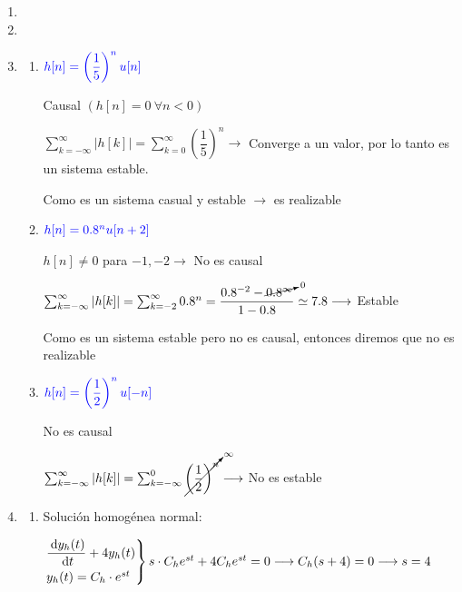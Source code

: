 \begin{enumerate}[label=\color{red}\textbf{\arabic*)}, leftmargin=*]
\begin{enumerate}[label=\color{lightblue}\arabic*)]
		\item {}
		
		\item {} 
	\end{enumerate}
	\item 
	\item 
	\item {}
	\begin{enumerate}[label=\color{red}\alph*)]
		\item $\textcolor{blue}{h[n]=\left(\dfrac{1}{5}\right)^nu[n]}$
		
		Causal $(h[n]=0\:\forall n<0)$
		
		$\sum_{k=-\infty}^{\infty}\left|h[k]\right|=\sum_{k=0}^{\infty}\left(\dfrac{1}{5}\right)^n\longrightarrow$ Converge a un valor, por lo tanto es un sistema estable.
		
		Como es un sistema casual y estable $\longrightarrow$ es realizable
		\item $\textcolor{blue}{h[n]=0.8^nu[n+2]}$
		
		$h[n]\neq0$ para $-1,-2\longrightarrow$ No es causal
		
		$\sum_{k=-\infty}^{\infty}\left|h[k]\right|=\sum_{k=-2}^{\infty}0.8^n=\dfrac{0.8^{-2}-\cancelto{0}{0.8^{\infty}}}{1-0.8}\simeq7.8\longrightarrow$ Estable
		
		Como es un sistema estable pero no es causal, entonces diremos que no es realizable
		\item $\textcolor{blue}{h[n]=\left(\dfrac{1}{2}\right)^nu[-n]}$
		
		No es causal
		
		$\sum_{k=-\infty}^{\infty}\left|h[k]\right|=\sum_{k=-\infty}^{0}\cancelto{\infty}{\left(\dfrac{1}{2}\right)^n}\longrightarrow$ No es estable
	\end{enumerate}
	\item {}
	\begin{enumerate}[label=\color{red}\alph*)]
		\item {}
		
		Solución homogénea normal:
		
		$\begin{rcases}
			\dfrac{\:\mathrm{d}y_h(t)}{\:\mathrm{d}t}+4y_h(t)\\
			y_h(t)=C_h\cdot e^{st}
		\end{rcases}s\cdot C_h e^{st}+4C_he^{st}=0\longrightarrow C_h(s+4)=0\longrightarrow s=4$
		

\end{enumerate}
\end{enumerate}
